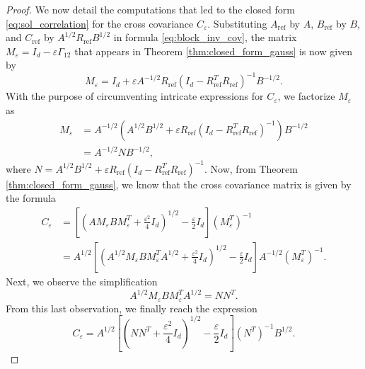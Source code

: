 \documentclass[]{article}
\DeclareMathOperator{\refe}{ref}
\numberwithin{equation}{section}
\theoremstyle{plain}
\begin{document}
\begin{proof}
	We now detail the computations that led to the closed form \eqref{eq:sol_correlation} for the cross covariance $C_\varepsilon$.
	Substituting $A_{\refe}$ by $A$,  $B_{\refe}$ by $B$, and $C_{\refe}$ by $A^{1/2} R_{\refe}B^{1/2}$ in formula \eqref{eq:block_inv_cov}, the matrix $M_{\varepsilon}= I_d - \varepsilon \Gamma_{12}$ that appears in Theorem \ref{thm:closed_form_gauss} is now given by 
	\begin{equation*}
		M_{\varepsilon}= I_d + \varepsilon A^{-1/2} R_{\refe}(I_d - R_{\refe}^TR_{\refe})^{-1}B^{-1/2}.
	\end{equation*}
	With the purpose of circumventing intricate expressions for $C_\varepsilon$, we factorize $M_\varepsilon$ as 
	\begin{align*}
		M_{\varepsilon}& = A^{-1/2}(A^{1/2}B^{1/2}+ \varepsilon R_{\refe}(I_d - R_{\refe}^T R_{\refe})^{-1})B^{-1/2}\\
		& = A^{-1/2} N B^{-1/2}, 
	\end{align*}
	where $N=A^{1/2}B^{1/2}+ \varepsilon R_{\refe}(I_d - R_{\refe}^TR_{\refe})^{-1}$. Now, from Theorem \ref{thm:closed_form_gauss}, we know that the cross covariance matrix is given by the formula 
	\begin{align*}
		C_\varepsilon &=\left[\left( AM_{\varepsilon}BM_{\varepsilon}^T+\frac{\varepsilon^2}{4}I_d\right)^{1/2} - \frac{\varepsilon}{2}I_d \right](M_\varepsilon^T)^{-1} \\
		& = A^{1/2}\left[ \left( A^{1/2}M_{\varepsilon}BM_\varepsilon^TA^{1/2} +\frac{\varepsilon^2}{4}I_d\right)^{1/2}- \frac{\varepsilon}{2}I_d \right]A^{-1/2} (M_\varepsilon^T)^{-1}.
	\end{align*}
	Next, we observe the simplification
	\begin{equation}
		A^{1/2}M_{\varepsilon}BM_\varepsilon^T A^{1/2} = NN^T.
	\end{equation}
	From this last observation, we finally reach the expression
	\begin{equation*}
		C_{\varepsilon} = A^{1/2}\left[ \left(N N^T+\frac{\varepsilon^2}{4}I_d\right)^{1/2}- \frac{\varepsilon}{2}I_d \right] (N^T)^{-1}B^{1/2}.
	\end{equation*}
	
\end{proof}
\end{document}
